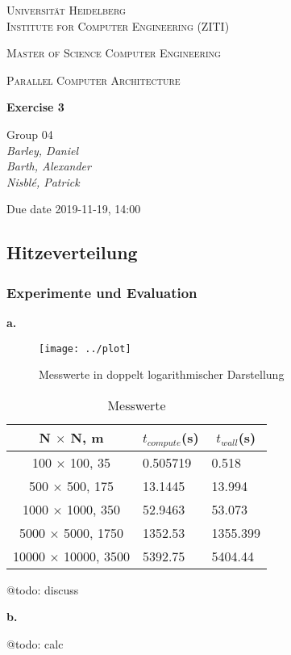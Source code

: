 \documentclass[12pt]{article}
\newcommand{\lecture}{Parallel Computer Architecture}
\newcommand{\exercise}{Exercise 3}
\newcommand{\groupnumber}{Group 04}
\newcommand{\groupmemberslist}{Barley, Daniel\\Barth, Alexander\\Nisblé, Patrick}
\newcommand{\duedate}{2019-11-19, 14:00}
\begin{document}
	\begin{titlepage}
		\centering
		
		{\scshape\LARGE Universität Heidelberg\\Institute for Computer Engineering (ZITI) \par}
		\vspace{1.5cm}
		{\scshape\Large Master of Science Computer Engineering \par}
		\vspace{0.5cm}
		{\scshape\Large \lecture \par}
		\vspace{1.5cm}
		{\huge\bfseries \exercise \par}
		\vspace{2cm}
		{\Large \groupnumber \itshape  \\ \groupmemberslist \par}
		\vfill
		
		
		{\large Due date \duedate \par}
	\end{titlepage}
\setcounter{section}{3}
\subsection{Hitzeverteilung}

\setcounter{subsubsection}{1}

\subsubsection{Experimente und Evaluation}

\noindent \textbf{a.}

\begin{figure}[ht]
	\centering
	\texttt{[image: ../plot]}
	\caption[Messwerte in doppelt logarithmischer Darstellung]{Messwerte in doppelt logarithmischer Darstellung}
	\label{fig:plot}
\end{figure}

\begin{table}[ht]
	\centering
	\caption[Messwerte]{Messwerte}
	\begin{tabular}{c|l|l}
		\hline
		\cellcolor{gray!40}\textbf{N $\times$ N, m} & \multicolumn{1}{c}{\cellcolor{gray!40}\textbf{$t_{compute}$(\si{\second})}} & \multicolumn{1}{c}{\cellcolor{gray!40}\textbf{$t_{wall}$(\si{\second})}}\\
		\hline\hline
		100 $\times$ 100, 35 & 0.505719 & 0.518\\\hline
		500 $\times$ 500, 175 & 13.1445 & 13.994\\\hline
		1000 $\times$ 1000, 350 & 52.9463 & 53.073\\\hline
		5000 $\times$ 5000, 1750 & 1352.53 & 1355.399\\\hline
		10000 $\times$ 10000, 3500 & 5392.75 & 5404.44\\\hline
	\end{tabular}
	\label{tab:values}
\end{table}

@todo: discuss

\noindent \textbf{b.}

@todo: calc
\end{document}
